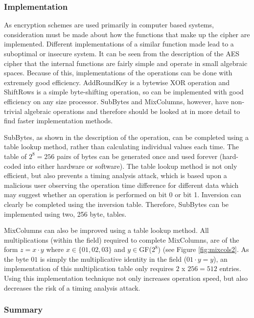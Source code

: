 \documentclass[a4paper,10pt]{report}
\begin{document}
\subsubsection{Implementation}


As encryption schemes are used primarily in computer based systems, consideration must be made about how the functions that make up the cipher are implemented. Different implementations of a similar function made lead to a suboptimal or insecure system. It can be seen from the description of the AES cipher that the internal functions are fairly simple and operate in small algebraic spaces. Because of this, implementations of the operations can be done with extremely good efficiency. AddRoundKey is a bytewise XOR operation and ShiftRows is a simple byte-shifting operation, so can be implemented with good efficiency on any size processor. SubBytes and MixColumns, however, have non-trivial algebraic operations and therefore should be looked at in more detail to find faster implementation methods. 

SubBytes, as shown in the description of the operation, can be completed using a table lookup method, rather than calculating individual values each time. The table of $2^{8} = 256$ pairs of bytes can be generated once and used forever (hard-coded into either hardware or software). The table lookup method is not only efficient, but also prevents a timing analysis attack, which is based upon a malicious user observing the operation time difference for different data which may suggest whether an operation is performed on bit 0 or bit 1. Inversion can clearly be completed using the inversion table. Therefore, SubBytes can be implemented using two, 256 byte, tables. 

MixColumns can also be improved using a table lookup method. All multiplications (within the field) required to complete MixColumns, are of the form $z = x \cdotp y$ where $x \in \{01,02,03\}$ and $y \in $GF($2^{8}$) (see Figure \ref{fig:mixcols2}. As the byte $01$ is simply the multiplicative identity in the field ($01 \cdotp y = y$), an implementation of this multiplication table only requires $2$ x $256 = 512$ entries. Using this implementation technique not only increases operation speed, but also decreases the risk of a timing analysis attack. 

\subsubsection{Summary}
\end{document}
